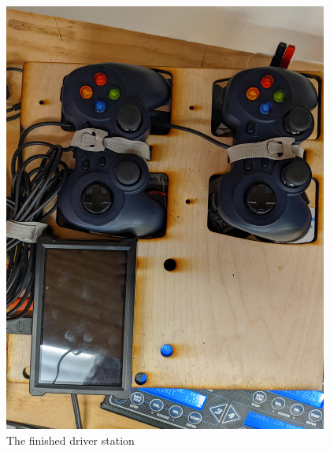 \begin{figure}[htp]
\centering
\includegraphics[width=0.95\textwidth, angle=0]{Meetings/February/02-03-22/PXL_20220204_011127244.MP - Jensen Miller.jpg}
\caption{The finished driver station}
\label{fig:pic1}
\end{figure}



